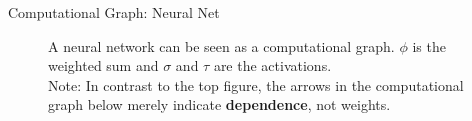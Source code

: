 \begin{frame} {Computational Graph: Neural Net}
  \begin{figure}
      \centering
        \caption{A neural network can be seen as a computational graph. $\phi$ is the weighted sum and $\sigma$ and $\tau$ are the activations. \\
        Note: In contrast to the top figure, the arrows in the computational graph below merely indicate \textbf{dependence}, not weights.}
    \end{figure}
\end{frame}
%   

